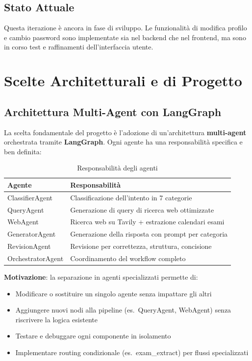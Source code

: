 \documentclass[a4paper,12pt]{report}
\begin{document}
\section{Stato Attuale}

Questa iterazione è ancora in fase di sviluppo. Le funzionalità di modifica profilo e cambio password sono implementate sia nel backend che nel frontend, ma sono in corso test e raffinamenti dell'interfaccia utente.


\chapter{Scelte Architetturali e di Progetto}

\section{Architettura Multi-Agent con LangGraph}

La scelta fondamentale del progetto è l'adozione di un'architettura \textbf{multi-agent} orchestrata tramite \textbf{LangGraph}. Ogni agente ha una responsabilità specifica e ben definita:

\begin{table}[H]
\centering
\begin{tabularx}{\textwidth}{l X}
\toprule
\textbf{Agente} & \textbf{Responsabilità} \\
\midrule
ClassifierAgent & Classificazione dell'intento in 7 categorie \\
QueryAgent & Generazione di query di ricerca web ottimizzate \\
WebAgent & Ricerca web su Tavily + estrazione calendari esami \\
GeneratorAgent & Generazione della risposta con prompt per categoria \\
RevisionAgent & Revisione per correttezza, struttura, concisione \\
OrchestratorAgent & Coordinamento del workflow completo \\
\bottomrule
\end{tabularx}
\caption{Responsabilità degli agenti}
\end{table}

\textbf{Motivazione}: la separazione in agenti specializzati permette di:
\begin{itemize}
    \item Modificare o sostituire un singolo agente senza impattare gli altri
    \item Aggiungere nuovi nodi alla pipeline (es.\ QueryAgent, WebAgent) senza riscrivere la logica esistente
    \item Testare e debuggare ogni componente in isolamento
    \item Implementare routing condizionale (es.\ exam\_extract) per flussi specializzati
\end{itemize}
\end{document}
